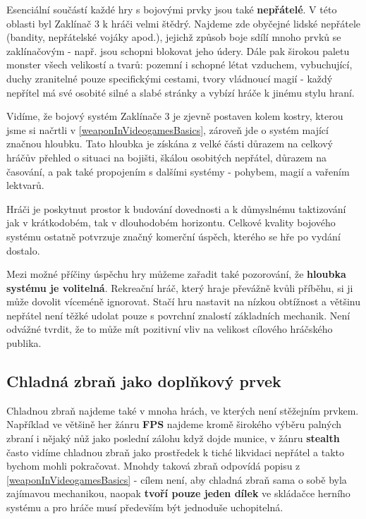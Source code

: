 Esenciální součástí každé hry s bojovými prvky jsou také \textbf{nepřátelé}. V této oblasti byl Zaklínač 3 k hráči velmi štědrý. Najdeme zde obyčejné lidské nepřátele (bandity, nepřátelské vojáky apod.), jejichž způsob boje sdílí mnoho prvků se zaklínačovým - např. jsou schopni blokovat jeho údery. Dále pak širokou paletu monster všech velikostí a tvarů: pozemní i schopné létat vzduchem, vybuchující, duchy zranitelné pouze specifickými cestami, tvory vládnoucí magií - každý nepřítel má své osobité silné a slabé stránky a vybízí hráče k jinému stylu hraní.

\bigbreak

Vidíme, že bojový systém Zaklínače 3 je zjevně postaven kolem kostry, kterou jsme si načrtli v \ref{weaponInVideogamesBasics}, zároveň jde o systém mající značnou hloubku. Tato hloubka je získána z velké části důrazem na celkový hráčův přehled o situaci na bojišti, škálou osobitých nepřátel, důrazem na časování, a pak také propojením s dalšími systémy - pohybem, magií a vařením lektvarů. 

Hráči je poskytnut prostor k budování dovednosti a k důmyslnému taktizování jak v krátkodobém, tak v dlouhodobém horizontu. Celkové kvality bojového systému ostatně potvrzuje značný komerční úspěch, kterého se hře po vydání dostalo.

Mezi možné příčiny úspěchu hry můžeme zařadit také pozorování, že \textbf{hloubka systému je volitelná}. Rekreační hráč, který hraje převážně kvůli příběhu, si ji může dovolit víceméně ignorovat. Stačí hru nastavit na nízkou obtížnost a většinu nepřátel není těžké udolat pouze s povrchní znalostí základních mechanik. Není odvážné tvrdit, že to může mít pozitivní vliv na velikost cílového hráčského publika. 

\subsection{Chladná zbraň jako doplňkový prvek}

Chladnou zbraň najdeme také v mnoha hrách, ve kterých není stěžejním prvkem. Například ve většině her žánru \textbf{\acs{FPS}} najdeme kromě širokého výběru palných zbraní i nějaký nůž jako poslední zálohu když dojde munice, v žánru \textbf{stealth} často vidíme chladnou zbraň jako prostředek k tiché likvidaci nepřátel a takto bychom mohli pokračovat. Mnohdy taková zbraň odpovídá popisu z \ref{weaponInVideogamesBasics} - cílem není, aby chladná zbraň sama o sobě byla zajímavou mechanikou, naopak \textbf{tvoří pouze jeden dílek} ve skládačce herního systému a pro hráče musí především být jednoduše uchopitelná. 

